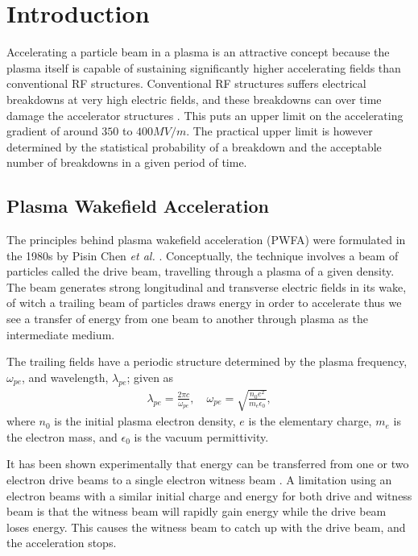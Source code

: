 %
%

\chapter{Introduction}
\label{Ch:Intro}

Accelerating a particle beam in a plasma is an attractive concept because the plasma itself is
capable of sustaining significantly higher accelerating fields than conventional RF structures.
Conventional RF structures suffers electrical breakdowns at very high electric fields, and these
breakdowns can over time damage the accelerator structures \cite{braun:2003}. This puts an upper
limit on the accelerating gradient of around $350$ to $400\unit{MV/m}$. The practical upper limit is
however determined by the statistical probability of a breakdown and the acceptable number of
breakdowns in a given period of time.\cite{pritzkau:2002} 

\section{Plasma Wakefield Acceleration}
\label{Int:PWFA}

The principles behind plasma wakefield acceleration (PWFA) were formulated in the 1980s by Pisin
Chen \emph{et al.} \cite{chen:1985}. Conceptually, the technique involves a beam of particles called
the drive beam, travelling through a plasma of a given density. The beam generates strong
longitudinal and transverse electric fields in its wake, of witch a trailing beam of particles draws
energy in order to accelerate \dash thus we see a transfer of energy from one beam to another
through plasma as the intermediate medium.

The trailing fields have a periodic structure determined by the plasma frequency, $\omega_{pe}$, and
wavelength, $\lambda_{pe}$; given as \begin{align} \lambda_{pe} = \frac{2\pi c}{\omega_{pe}}, \quad
\omega_{pe} = \sqrt{\frac{n_{0}e^{2}}{m_{e}\epsilon_{0}}}, \label{EQ:PWFA:L0W0} \end{align} where
$n_{0}$ is the initial plasma electron density, $e$ is the elementary charge, $m_{e}$ is the
electron mass, and $\epsilon_{0}$ is the vacuum permittivity.

It has been shown experimentally that energy can be transferred from one or two electron drive beams
to a single electron witness beam \cite{rosenzweig:1988, blumenfeld:2007, kallos:2008}. A limitation
using an electron beams with a similar initial charge and energy for both drive and witness beam is
that the witness beam will rapidly gain energy while the drive beam loses energy. This causes the
witness beam to catch up with the drive beam, and the acceleration stops. 

